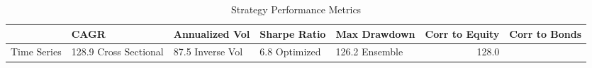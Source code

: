 \begin{table}
\caption{Strategy Performance Metrics}
\begin{tabular}{lllllrr}
\toprule
 & CAGR & Annualized Vol & Sharpe Ratio & Max Drawdown & Corr to Equity & Corr to Bonds \\
\midrule
Time Series & 128.9%
Cross Sectional & 87.5%
Inverse Vol & 6.8%
Optimized & 126.2%
Ensemble & 128.0%
\bottomrule
\end{tabular}
\end{table}
